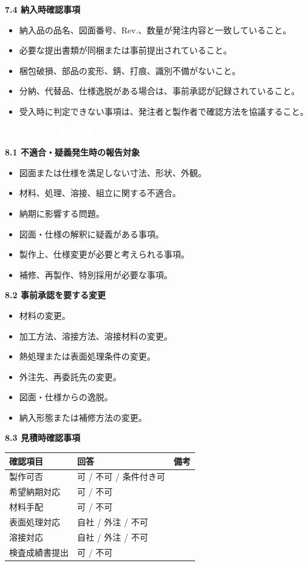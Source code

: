 \documentclass[a4paper,10pt]{ltjsarticle}
\makeatletter
\newlength{\SpecBodyWidth}
\newcommand{\PageTitle}[1]{%
  \vspace*{2mm}%
  \noindent\colorbox{SpecHead}{%
    \parbox{\dimexpr\SpecBodyWidth-2\fboxsep\relax}{%
      \large\bfseries\textcolor{white}{#1}%
    }%
  }%
  \par\vspace{5mm}%
}
\newcommand{\BlockTitle}[1]{%
  \vspace{4mm}%
  \noindent\colorbox{SpecSoft}{%
    \parbox{\dimexpr\SpecBodyWidth-2\fboxsep\relax}{%
      \normalsize\bfseries\textcolor{SpecHead}{#1}%
    }%
  }%
  \par\vspace{1.5mm}%
}
\newcommand{\Note}[1]{%
  \vspace{1.5mm}%
  \noindent\fbox{%
    \parbox{\dimexpr\SpecBodyWidth-2\fboxsep-2\fboxrule\relax}{%
      \footnotesize\textcolor{SpecMuted}{#1}%
    }%
  }%
  \par\vspace{1.5mm}%
}
\newenvironment{SpecTable}[1]{%
  \par\vspace{1mm}%
  \noindent\footnotesize%
  \renewcommand{\arraystretch}{1.10}%
  \setlength{\tabcolsep}{3.0pt}%
  \begin{tabular*}{\SpecBodyWidth}{@{\extracolsep{\fill}}#1@{}}%
}{%
  \end{tabular*}%
  \par\vspace{1.5mm}%
}
\newcommand{\Head}[1]{\textbf{\textcolor{SpecHead}{#1}}}
\makeatother
\begin{document}
\BlockTitle{7.4 納入時確認事項}
\begin{itemize}
  \item 納入品の品名、図面番号、Rev.、数量が発注内容と一致していること。
  \item 必要な提出書類が同梱または事前提出されていること。
  \item 梱包破損、部品の変形、錆、打痕、識別不備がないこと。
  \item 分納、代替品、仕様逸脱がある場合は、事前承認が記録されていること。
  \item 受入時に判定できない事項は、発注者と製作者で確認方法を協議すること。
\end{itemize}

\clearpage

\PageTitle{8. 品質保証・変更管理}

\BlockTitle{8.1 不適合・疑義発生時の報告対象}
\begin{itemize}
  \item 図面または仕様を満足しない寸法、形状、外観。
  \item 材料、処理、溶接、組立に関する不適合。
  \item 納期に影響する問題。
  \item 図面・仕様の解釈に疑義がある事項。
  \item 製作上、仕様変更が必要と考えられる事項。
  \item 補修、再製作、特別採用が必要な事項。
\end{itemize}
\Note{不適合品の補修、再製作、特別採用は、発注者の承認なく実施しないこと。}

\BlockTitle{8.2 事前承認を要する変更}
\begin{itemize}
  \item 材料の変更。
  \item 加工方法、溶接方法、溶接材料の変更。
  \item 熱処理または表面処理条件の変更。
  \item 外注先、再委託先の変更。
  \item 図面・仕様からの逸脱。
  \item 納入形態または補修方法の変更。
\end{itemize}

\BlockTitle{8.3 見積時確認事項}
\begin{SpecTable}{|p{48mm}|p{40mm}|p{58mm}|}
\hline
\Head{確認項目} & \Head{回答} & \Head{備考} \\
\hline
製作可否 & 可 / 不可 / 条件付き可 &  \\
\hline
希望納期対応 & 可 / 不可 &  \\
\hline
材料手配 & 可 / 不可 &  \\
\hline
表面処理対応 & 自社 / 外注 / 不可 &  \\
\hline
溶接対応 & 自社 / 外注 / 不可 &  \\
\hline
検査成績書提出 & 可 / 不可 &  \\
\hline
\end{SpecTable}
\end{document}
